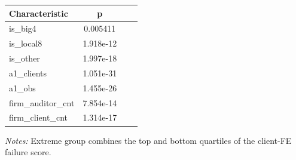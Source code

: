 \documentclass[10pt]{article}
\begin{document}
\begin{minipage}{19cm}\fontsize{10}{12}\selectfont\setlength{\tabcolsep}{4pt}\renewcommand{\arraystretch}{1.12}


\centering
{}
\begin{threeparttable}
\begin{tabular}{p{}ccc}
\toprule
Characteristic & p &  &  \\
\midrule
is\_big4 & 0.005411 &  &  \\
is\_local8 & 1.918e-12 &  &  \\
is\_other & 1.997e-18 &  &  \\
a1\_clients & 1.051e-31 &  &  \\
a1\_obs & 1.455e-26 &  &  \\
firm\_auditor\_cnt & 7.854e-14 &  &  \\
firm\_client\_cnt & 1.314e-17 &  &  \\
\bottomrule
\end{tabular}
\begin{tablenotes}\fontsize{9}{11}\selectfont
\item \raggedright \fontsize{9}{11}\selectfont \textit{Notes:} Extreme group combines the top and bottom quartiles of the client-FE failure score.
\end{tablenotes}
\end{threeparttable}

\end{minipage}
\end{document}
